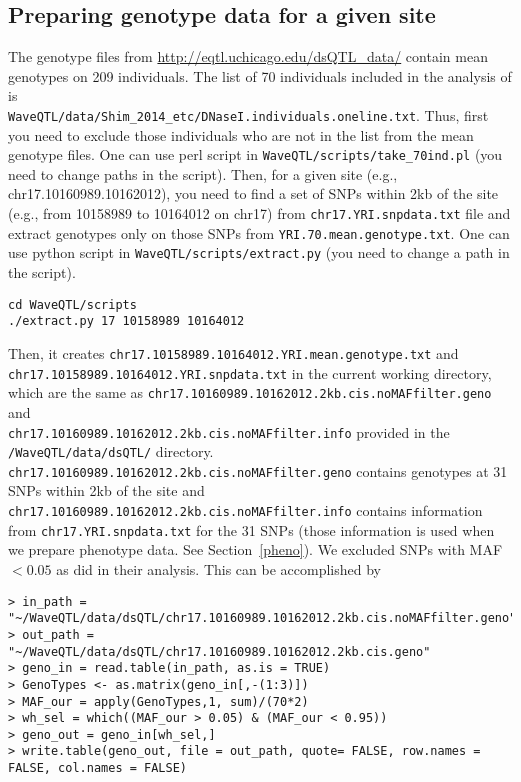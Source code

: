 \documentclass[11pt]{article}
\begin{document}
\subsection{Preparing genotype data for a given site}
The genotype files from \url{http://eqtl.uchicago.edu/dsQTL_data/} contain mean genotypes on 209 individuals. The list of 70 individuals included in the analysis of \cite{Shim2014} is \\{\tt WaveQTL/data/Shim\_2014\_etc/DNaseI.individuals.oneline.txt}. Thus, first you need to exclude those individuals who are not in the list from the mean genotype files. One can use perl script in {\tt WaveQTL/scripts/take\_70ind.pl} (you need to change paths in the script). Then, for a given site (e.g., chr17.10160989.10162012), you need to find a set of SNPs within 2kb of the site (e.g., from 10158989 to 10164012 on chr17) from {\tt chr17.YRI.snpdata.txt} file and extract genotypes only on those SNPs from {\tt YRI.70.mean.genotype.txt}. One can use python script in {\tt WaveQTL/scripts/extract.py} (you need to change a path in the script). 
\begin{verbatim}
cd WaveQTL/scripts
./extract.py 17 10158989 10164012
\end{verbatim}
Then, it creates {\tt chr17.10158989.10164012.YRI.mean.genotype.txt} and \\{\tt chr17.10158989.10164012.YRI.snpdata.txt} in the current working directory, which are the same as {\tt chr17.10160989.10162012.2kb.cis.noMAFfilter.geno} and \\{\tt chr17.10160989.10162012.2kb.cis.noMAFfilter.info} provided in the {\tt /WaveQTL/data/dsQTL/} directory. 
{\tt chr17.10160989.10162012.2kb.cis.noMAFfilter.geno} contains genotypes at 31 SNPs within 2kb of the site and {\tt chr17.10160989.10162012.2kb.cis.noMAFfilter.info} contains information from {\tt chr17.YRI.snpdata.txt} for the 31 SNPs (those information is used when we prepare phenotype data. See Section~\ref{pheno}). 
We excluded SNPs with MAF $<0.05$ as \cite{Degner_2012} did in their analysis.
This can be accomplished by 
\begin{verbatim}
> in_path = "~/WaveQTL/data/dsQTL/chr17.10160989.10162012.2kb.cis.noMAFfilter.geno"
> out_path =  "~/WaveQTL/data/dsQTL/chr17.10160989.10162012.2kb.cis.geno"
> geno_in = read.table(in_path, as.is = TRUE)
> GenoTypes <- as.matrix(geno_in[,-(1:3)])
> MAF_our = apply(GenoTypes,1, sum)/(70*2)
> wh_sel = which((MAF_our > 0.05) & (MAF_our < 0.95))
> geno_out = geno_in[wh_sel,]
> write.table(geno_out, file = out_path, quote= FALSE, row.names = FALSE, col.names = FALSE)
\end{verbatim}
\end{document}
